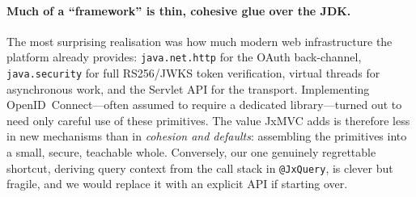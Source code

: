 \paragraph{Much of a ``framework'' is thin, cohesive glue over the JDK.}
The most surprising realisation was how much modern web infrastructure
the platform already provides: \texttt{java.net.http} for the OAuth
back-channel, \texttt{java.security} for full RS256/JWKS token
verification, virtual threads for asynchronous work, and the Servlet
API for the transport. Implementing OpenID~Connect---often assumed to
require a dedicated library---turned out to need only careful use of
these primitives. The value JxMVC adds is therefore less in new
mechanisms than in \emph{cohesion and defaults}: assembling the
primitives into a small, secure, teachable whole. Conversely, our one
genuinely regrettable shortcut, deriving query context from the call
stack in \texttt{@JxQuery}, is clever but fragile, and we would replace
it with an explicit API if starting over.
